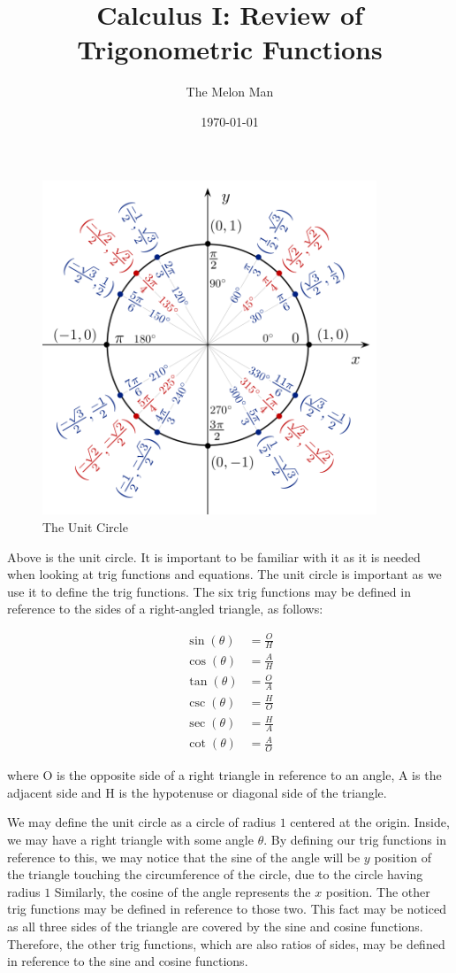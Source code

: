 \documentclass[12pt]{article}
\title{Calculus I: Review of Trigonometric Functions}
\author{The Melon Man}
\date{\today}
\begin{document}
\maketitle

\begin{figure}[h]
    \includegraphics[width=10cm, height=10cm]{unit_circle.png}
    \centering
    \caption{The Unit Circle}
    \label{fig:fig1}
\end{figure}

Above is the unit circle.
It is important to be familiar with it as it is needed when looking at trig functions and equations.
The unit circle is important as we use it to define the trig functions.
The six trig functions may be defined in reference to the sides of a right-angled triangle, as follows:

\begin{align}
    \sin(\theta) & = \frac{O}{H} \\
    \cos(\theta) & = \frac{A}{H} \\
    \tan(\theta) & = \frac{O}{A} \\
    \csc(\theta) & = \frac{H}{O} \\
    \sec(\theta) & = \frac{H}{A} \\
    \cot(\theta) & = \frac{A}{O}
\end{align}

where O is the opposite side of a right triangle in reference to an angle, A is the adjacent side and H is the hypotenuse or diagonal side of the triangle.

We may define the unit circle as a circle of radius $1$ centered at the origin.
Inside, we may have a right triangle with some angle $\theta$.
By defining our trig functions in reference to this, we may notice that the sine of the angle will be $y$ position of the triangle touching the circumference of the circle, due to the circle having radius $1$
Similarly, the cosine of the angle represents the $x$ position.
The other trig functions may be defined in reference to those two.
This fact may be noticed as all three sides of the triangle are covered by the sine and cosine functions.
Therefore, the other trig functions, which are also ratios of sides, may be defined in reference to the sine and cosine functions.
\end{document}
